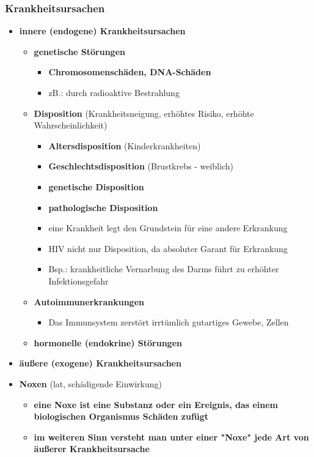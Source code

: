 \subsubsection{Krankheitsursachen}
	\begin{itemize}
		\item \textbf{innere (endogene) Krankheitsursachen}
			\begin{itemize}
				\item \textbf{genetische Störungen}
					\begin{itemize}
						\item \textbf{Chromosomenschäden, DNA-Schäden}
						\item zB.: durch radioaktive Bestrahlung
					\end{itemize}
				\item \textbf{Disposition} (Krankheitsneigung, erhöhtes Risiko, erhöhte Wahrscheinlichkeit)
					\begin{itemize}
						\item \textbf{Altersdisposition} (Kinderkrankheiten)
						\item \textbf{Geschlechtsdisposition} (Brustkrebs - weiblich)
						\item \textbf{genetische Disposition}
						\item \textbf{pathologische Disposition}
						\item eine Krankheit legt den Grundstein für eine andere Erkrankung
						\item HIV nicht nur Disposition, da absoluter Garant für Erkrankung
						\item Bsp.: krankheitliche Vernarbung des Darms führt zu erhöhter Infektionsgefahr 
					\end{itemize}
				\item \textbf{Autoimmunerkrankungen}
					\begin{itemize}
						\item Das Immunsystem zerstört irrtümlich gutartiges Gewebe, Zellen
					\end{itemize}
				\item \textbf{hormonelle (endokrine) Störungen}
			\end{itemize}
\pagebreak
		\item \textbf{äußere (exogene) Krankheitsursachen}
		\item \textbf{Noxen} (lat, schädigende Einwirkung)
			\begin{itemize}
				\item \textbf{eine Noxe ist eine Substanz oder ein Ereignis, das einem biologischen Organismus Schäden zufügt}
				\item \textbf{im weiteren Sinn versteht man unter einer "Noxe" jede Art von äußerer Krankheitsursache}
			\end{itemize}
	\end{itemize}
